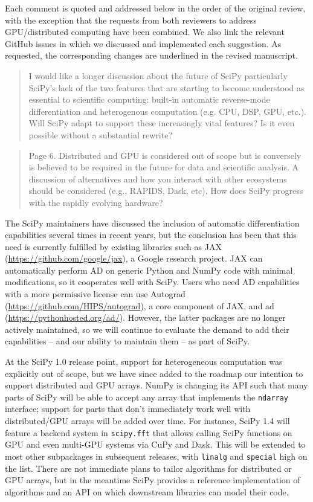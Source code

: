 \documentclass[10pt,stdletter,dateno]{newlfm}
\begin{document}
\begin{newlfm}

Each comment is quoted and addressed below in the order of the original review, with the exception that the requests from both reviewers to address GPU/distributed computing have been combined. We also link the relevant GitHub issues in which we discussed and implemented each suggestion. As requested, the corresponding changes are underlined in the revised manuscript.

\begin{quote}
I would like a longer discussion about the future of SciPy particularly SciPy’s lack of the two features that are starting to become understood as essential to scientific computing: built-in automatic reverse-mode differentiation and heterogenous computation (e.g. CPU, DSP, GPU, etc.). Will SciPy adapt to support these increasingly vital features? Is it even possible without a substantial rewrite?
\end{quote}

\begin{quote}
Page 6. Distributed and GPU is considered out of scope but is conversely is believed to be required in the future for data and scientific analysis. A discussion of alternatives and how you interact with other ecosystems should be considered (e.g., RAPIDS, Dask, etc). How does SciPy progress with the rapidly evolving hardware?
\end{quote}

The SciPy maintainers have discussed the inclusion of automatic differentiation capabilities several times in recent years, but the conclusion has been that this need is currently fulfilled by existing libraries such as JAX (\url{https://github.com/google/jax}), a Google research project. JAX can automatically perform AD on generic Python and NumPy code with minimal modifications, so it cooperates well with SciPy. Users who need AD capabilities with a more permissive license can use Autograd (\url{https://github.com/HIPS/autograd}), a core component of JAX, and ad (\url{https://pythonhosted.org/ad/}). However, the latter packages are no longer actively maintained, so we will continue to evaluate the demand to add their capabilities -- and our ability to maintain them -- as part of SciPy.

At the SciPy 1.0 release point, support for heterogeneous computation was explicitly out of scope, but we have since added to the roadmap our intention to support distributed and GPU arrays. NumPy is changing its API such that many parts of SciPy will be able to accept any array that implements the \texttt{ndarray} interface; support for parts that don't immediately work well with distributed/GPU arrays will be added over time. For instance, SciPy 1.4 will feature a backend system in \texttt{scipy.fft} that allows calling SciPy functions on GPU and even multi-GPU systems via CuPy and Dask. This will be extended to most other subpackages in subsequent releases, with \texttt{linalg} and \texttt{special} high on the list. There are not immediate plans to tailor algorithms for distributed or GPU arrays, but in the meantime SciPy provides a reference implementation of algorithms and an API on which downstream libraries can model their code.


\end{newlfm}
\end{document}
